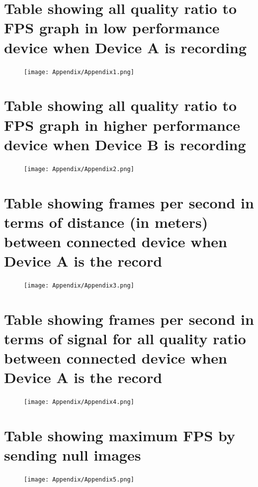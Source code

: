 \documentclass[a4paper,12pt]{article}
\begin{document}
\begin{appendices}
\chapter{Table showing all quality ratio to FPS graph in low performance device when Device A is recording}

\begin{figure}[h!]
\centering
\texttt{[image: Appendix/Appendix1.png]}
\end{figure}

\newpage
\chapter{Table showing  all quality ratio to FPS graph in higher performance device when Device B is recording}

\begin{figure}[h!]
\centering
\texttt{[image: Appendix/Appendix2.png]}
\end{figure}

\newpage
\chapter{Table showing frames per second in terms of distance (in meters) between connected device when Device A is the record}

\begin{figure}[h!]
\centering
\texttt{[image: Appendix/Appendix3.png]}
\end{figure}

\newpage
\chapter{Table showing frames per second in terms of signal for all quality ratio between connected device when Device A is the record}

\begin{figure}[h!]
\centering
\texttt{[image: Appendix/Appendix4.png]}
\end{figure}

\newpage
\chapter{Table showing maximum FPS by sending null images}

\begin{figure}[h!]
\centering
\texttt{[image: Appendix/Appendix5.png]}
\end{figure}


\end{appendices}
\end{document}

